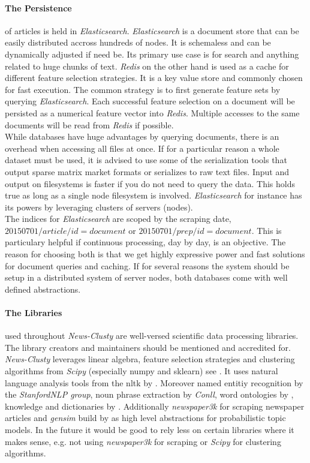   \paragraph{The Persistence} of articles is held in \emph{Elasticsearch}. \emph{Elasticsearch} is a document store that can be easily distributed accross hundreds of nodes. It is schemaless and can be dynamically adjusted if need be. Its primary use case is for search and anything related to huge chunks of text. \emph{Redis} on the other hand is used as a cache for different feature selection strategies. It is a key value store and commonly chosen for fast execution. The common strategy is to first generate feature sets by querying \emph{Elasticsearch}. Each successful feature selection on a document will be persisted as a numerical feature vector into \emph{Redis}. Multiple accesses to the same documents will be read from \emph{Redis} if possible.\\
  While databases have huge advantages by querying documents, there is an overhead when accessing all files at once. If for a particular reason a whole dataset must be used, it is advised to use some of the serialization tools that output sparse matrix market formats or serializes to raw text files. Input and output on filesystems is faster if you do not need to query the data. This holds true as long as a single node filesystem is involved. \emph{Elasticsearch} for instance has its powers by leveraging clusters of servers (nodes).\\ 
  The indices for \emph{Elasticsearch} are scoped by the scraping date, $20150701/article/id = document$ or $20150701/prep/id = document$. This is particulary helpful if continuous processing, day by day, is an objective. The reason for choosing both is that we get highly expressive power and fast solutions for document queries and caching. If for several reasons the system should be setup in a distributed system of server nodes, both databases come with well defined abstractions.

  \paragraph{The Libraries} used throughout \emph{News-Clusty} are well-versed scientific data processing libraries. The library creators and maintainers should be mentioned and accredited for. \emph{News-Clusty} leverages linear algebra, feature selection strategies and clustering algorithms from \emph{Scipy} (especially numpy and sklearn) see \cite{ScikitLearn}. It uses natural language analysis tools from the nltk by \cite{NltkPython}. Moreover named entitiy recognition by the \emph{StanfordNLP group}, noun phrase extraction by \emph{Conll}, word ontologies by \wordnet{}, knowledge and dictionaries by \wiki{}. Additionally \emph{newspaper3k} for scraping newspaper articles and \emph{gensim} build by \cite{gensim2010} as high level abstractions for probabilistic topic models. In the future it would be good to rely less on certain libraries where it makes sense, e.g. not using \emph{newspaper3k} for scraping or \emph{Scipy} for clustering algorithms.



